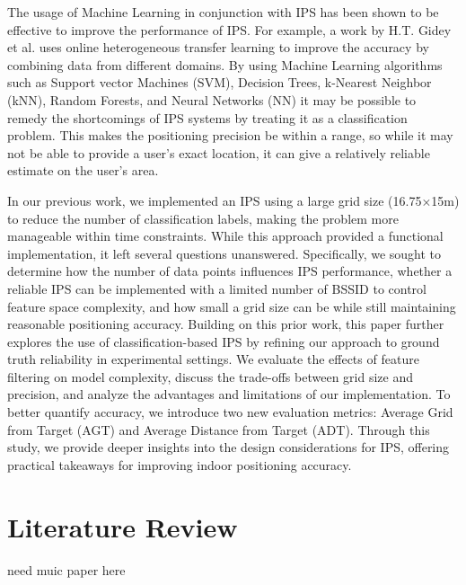 \documentclass[conference]{IEEEtran}
\begin{document}
	The usage of Machine Learning in conjunction with IPS has been shown to be effective to improve the performance of IPS. For example, a work by H.T. Gidey et al. \cite{bgp3} uses online heterogeneous transfer learning to improve the accuracy by combining data from different domains. By using Machine Learning algorithms such as Support vector Machines (SVM), Decision Trees, k-Nearest Neighbor (kNN), Random Forests, and Neural Networks (NN) it may be possible to remedy the shortcomings of IPS systems by treating it as a classification problem. This makes the positioning precision be within a range, so while it may not be able to provide a user's exact location, it can give a relatively reliable estimate on the user's area.
	
	In our previous work, we implemented an IPS using a large grid size (16.75×15m) to reduce the number of classification labels, making the problem more manageable within time constraints. While this approach provided a functional implementation, it left several questions unanswered. Specifically, we sought to determine how the number of data points influences IPS performance, whether a reliable IPS can be implemented with a limited number of BSSID to control feature space complexity, and how small a grid size can be while still maintaining reasonable positioning accuracy.
	Building on this prior work, this paper further explores the use of classification-based IPS by refining our approach to ground truth reliability in experimental settings. We evaluate the effects of feature filtering on model complexity, discuss the trade-offs between grid size and precision, and analyze the advantages and limitations of our implementation. To better quantify accuracy, we introduce two new evaluation metrics: Average Grid from Target (AGT) and Average Distance from Target (ADT). Through this study, we provide deeper insights into the design considerations for IPS, offering practical takeaways for improving indoor positioning accuracy.
	
	
	\section{Literature Review}
	need muic paper here
	
\end{document}
